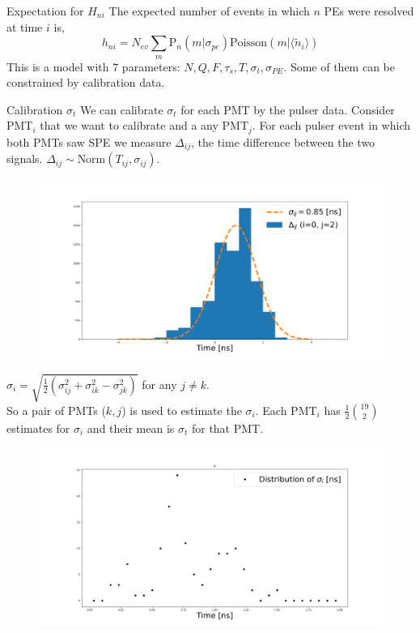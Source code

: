 \documentclass{beamer}
\begin{document}
\begin{frame}{Expectation for $H_{ni}$}
The expected number of events in which $n$ PEs were resolved at time $i$ is,
\begin{equation}
h_{ni}=N_{ev}\sum_{m}\text{P}_n(m|\sigma_{pe})\text{Poisson}(m|\langle \tilde{n}_i\rangle)
\end{equation}
This is a model with 7 parameters: $N, Q, F, \tau_s, T, \sigma_t, \sigma_{PE}$. Some of them can be constrained by calibration data.
\end{frame}

\begin{frame}{Calibration $\sigma_t$}
We can calibrate $\sigma_t$ for each PMT by the pulser data. Consider PMT$_i$ that we want to calibrate and a any PMT$_j$. For each pulser event in which both PMTs saw SPE we measure $\Delta_{ij}$, the time difference between the two signals. $\Delta_{ij}\sim\text{Norm}(T_{ij}, \sigma_{ij})$.
\begin{figure}[h]
\includegraphics[width=1\linewidth]{sigma_ij.png}
\end{figure}
\end{frame}

\begin{frame}
$\sigma_i=\sqrt{\frac{1}{2}(\sigma^2_{ij}+\sigma^2_{ik}-\sigma^2_{jk})}$ for any $j\neq k$.\\
So a pair of PMTs ($k,j$) is used to estimate the $\sigma_i$. Each PMT$_i$ has $\frac{1}{2}{19\choose 2}$ estimates for $\sigma_i$ and their mean is $\sigma_t$ for that PMT.
\begin{figure}[h]
\includegraphics[width=1\linewidth]{sigma_i.png}
\end{figure}
\end{frame}
\end{document}
